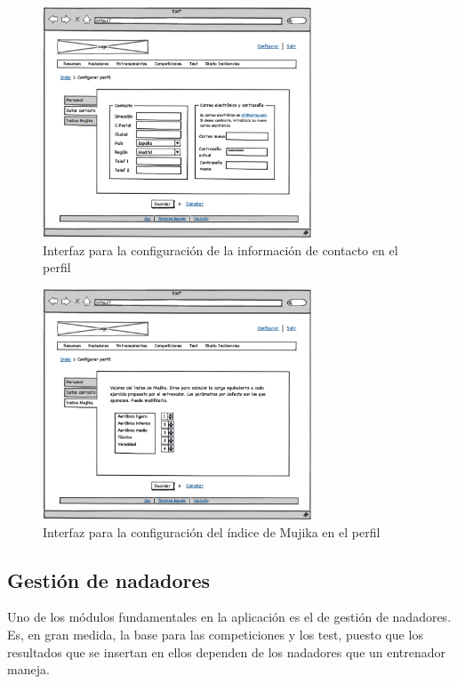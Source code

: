   		\begin{figure}[H]
  		  \centering
  		    \includegraphics[width=8cm]{./eps/p_interfaz/8_Conf_contacto.eps}
  		  \caption{Interfaz para la configuración de la información de contacto en el perfil}
  		  \label{fig:interfaz_conf_contacto}
  		\end{figure}

  		\begin{figure}[H]
  		  \centering
  		    \includegraphics[width=8cm]{./eps/p_interfaz/9_Conf_mujika.eps}
  		  \caption{Interfaz para la configuración del índice de Mujika en el perfil}
  		  \label{fig:interfaz_conf_mujika}
  		\end{figure}


  	\subsection{Gestión de nadadores} %
  		\label{sub:gestion_de_nadadores}

  	Uno de los módulos fundamentales en la aplicación es el de gestión de nadadores. Es, en gran medida, la base para las competiciones y los test, puesto que los resultados que se insertan en ellos dependen de los nadadores que un entrenador maneja. 

